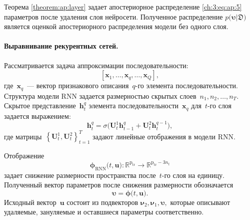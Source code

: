 Теорема \ref{theorem:ap:layer} задает апостериорное распределение \eqref{ch:3:eq:ap:5} параметров после удаления слоя нейросети. Полученное распределение $p\bigr(\bm{\upsilon}|\mathfrak{D}\bigr) $ является оценкой апостериорного распределения модели без одного слоя.

\paragraph{Выравнивание рекурентных сетей.} Рассматривается задача аппроксимации последовательности:
\[
    \left[\mathbf{x}_1, \ldots, \mathbf{x}_{q}, \ldots, \mathbf{x}_{Q}\right],
\]
где~$\mathbf{x}_{q}$~--- вектор признакового описания~$q$-го элемента последовательности. 
Структура модели RNN задается размерностью скрытых слоев~$n_1, n_2, \ldots, n_T.$ Скрытое представление~$\mathbf{h}^{q}_t$ элемента последовательности~$\mathbf{x}_{q}$ для~$t$-го слоя задается выражением:
\[
    \mathbf{h}^{q}_t = \sigma\bigr(\mathbf{U}^{1}_{t}\mathbf{h}^{q}_{t-1}+\mathbf{U}^{2}_{t}\mathbf{h}^{q-1}_{t}\bigr),
\]
где матрицы~$\left\{\mathbf{U}^{1}_{t}, \mathbf{U}^{2}_{t}\right\}_{t=1}^{T}$ задают линейные отображения в модели RNN.

Отображение
\[
\bm{\phi}_{\text{RNN}}\bigr(t, \mathbf{u}\bigr) : \mathbb{R}^{\text{p}_{\text{tr}}} \to \mathbb{R}^{\text{p}_{\text{tr}}-3n_t}
\]
задает снижение размерности пространства после~$t$-го слоя на единицу. Полученный вектор параметров после снижения размерности обозначается
\[
\bm{\upsilon} = \bm{\phi}\bigr(t, \mathbf{u}\bigr).
\]
Исходный вектор~$\mathbf{u}$ состоит из подвекторов $\bm{\nu}_2, {\bm{\nu}}_1, \bm{\upsilon},$ которые описывают удаляемые, зануляемые и оставшиеся параметры соответственно.

